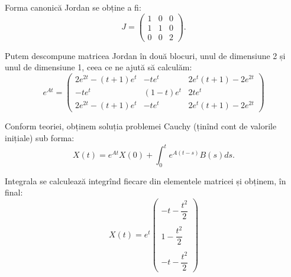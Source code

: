 Forma canonică Jordan se obține a fi:
\[
  J = \begin{pmatrix}
    1 & 0 & 0 \\
    1 & 1 & 0 \\
    0 & 0 & 2
  \end{pmatrix}.
\]

Putem descompune matricea Jordan în două blocuri, unul de dimensiune 2 și unul de
dimensiune 1, ceea ce ne ajută să calculăm:
\[
  e^{At} = \begin{pmatrix}
    2e^{2t} - (t + 1)e^t & -te^t & 2e^t(t + 1) - 2 e^{2t} \\
    -te^t & (1 - t)e^t & 2te^t \\
    2e^{2t} - (t + 1)e^t & -te^t & 2e^t(t + 1) -2e^{2t}
  \end{pmatrix}
\]

Conform teoriei, obținem soluția problemei Cauchy (ținînd cont de valorile inițiale) sub forma:
\[
  X(t) = e^{At} X(0) + \int_0^t e^{A(t-s)} B(s) ds.
\]

Integrala se calculează integrînd fiecare din elementele matricei și obținem, în final:
\[
  X(t) = e^t \begin{pmatrix}
    -t - \dfrac{t^2}{2} \\
    \\
    1 - \dfrac{t^2}{2} \\
    \\
    -t - \dfrac{t^2}{2}
  \end{pmatrix}
\]


